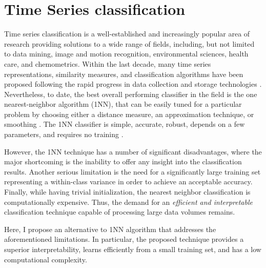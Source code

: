 \section{Time Series classification}
Time series classification is a well-established and increasingly popular area of research providing solutions to a wide 
range of fields, including, but not limited to data mining, image and motion recognition, environmental sciences, health care, 
and chemometrics. 
Within the last decade, many time series representations, similarity measures, and classification algorithms 
have been proposed following the rapid progress in data collection and storage technologies \cite{citeulike:10358271}. 
Nevertheless, to date, the best overall performing classifier in the field is the one nearest-neighbor algorithm (1NN), 
that can be easily tuned for a particular problem by choosing either a distance measure, an approximation technique, 
or smoothing \cite{citeulike:10358271}.
The 1NN classifier is simple, accurate, robust, depends on a few parameters, and requires no training 
\cite{citeulike:10358271} \cite{citeulike:532340} \cite{citeulike:12563424}.


However, the 1NN technique has a number of significant disadvantages, where the major shortcoming is the 
inability to offer any insight into the classification results. 
Another serious limitation is the need for a significantly large training set representing a within-class 
variance in order to achieve an acceptable accuracy. 
Finally, while having trivial initialization, the nearest neighbor classification is computationally expensive. 
Thus, the demand for an \textit{efficient and interpretable} classification technique capable of processing 
large data volumes remains.

Here, I propose an alternative to 1NN algorithm that addresses the aforementioned limitations. 
In particular, the proposed technique provides a superior interpretability, learns efficiently from a small 
training set, and has a low computational complexity. 

